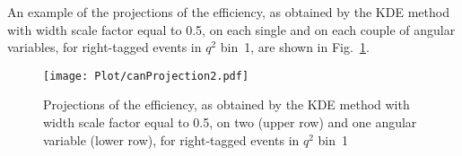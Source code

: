 





An example of the projections of the efficiency, as obtained by the KDE method with width scale factor equal to 0.5, on each single and on each couple of angular variables, for right-tagged events in $q^2$ bin~1, are shown in Fig.~\ref{fig:effPro1}.


\begin{figure}[hbt]
    \texttt{[image: Plot/canProjection2.pdf]}
    \caption{Projections of the efficiency, as obtained by the KDE method with width scale factor equal to 0.5, on two (upper row) and one angular variable (lower row), for right-tagged events in $q^2$ bin~1}
    \label{fig:effPro1}
\end{figure}


